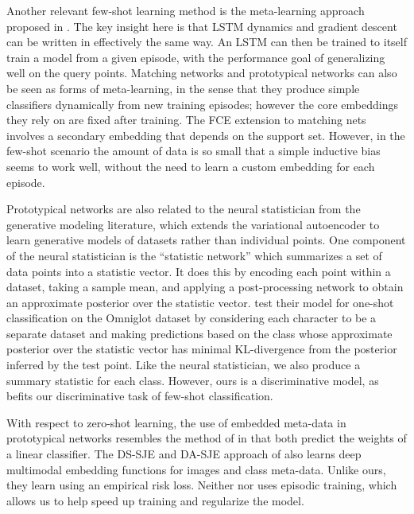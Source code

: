 \documentclass{article}
\begin{document}
Another relevant few-shot learning method is the meta-learning approach proposed in \citet{ravi2017meta}. 
The key insight here is that LSTM dynamics and gradient descent can be written in effectively the same way. An LSTM can then be trained to itself train a model from a given episode, with the performance goal of generalizing well on the query points. Matching networks and prototypical networks can also be seen as forms of meta-learning, in the sense that they produce simple classifiers dynamically from new training episodes; however the core embeddings they rely on are fixed after training. 
The FCE extension to matching nets involves a secondary embedding that depends on the support set. However, in the few-shot scenario the amount of data is so small that a simple inductive bias seems to work well, without the need to learn a custom embedding for each episode.

Prototypical networks are also related to the neural statistician \citep{edwards2017towards} from the generative modeling literature, which extends the variational autoencoder \citep{kingma2013auto,rezende2014stochastic} to learn generative models of datasets rather than individual points. One component of the neural statistician is the ``statistic network'' which summarizes a set of data points into a statistic vector. It does this by encoding each point within a dataset, taking a sample mean, and applying a post-processing network to obtain an approximate posterior over the statistic vector. \citeauthor{edwards2017towards} test their model for one-shot classification on the Omniglot dataset by considering each character to be a separate dataset and making predictions based on the class whose approximate posterior over the statistic vector has minimal KL-divergence from the posterior inferred by the test point. Like the neural statistician, we also produce a summary statistic for each class. However, ours is a discriminative model, as befits our discriminative task of few-shot classification.

With respect to zero-shot learning, the use of embedded meta-data in prototypical networks resembles the method of \cite{lei2015predicting} in that both predict the weights of a linear classifier. The DS-SJE and DA-SJE approach of \cite{reed2016learning} also learns deep multimodal embedding functions for images and class meta-data. Unlike ours, they learn using an empirical risk loss. Neither \cite{lei2015predicting} nor \cite{reed2016learning} uses episodic training, which allows us to help speed up training and regularize the model.
\end{document}
